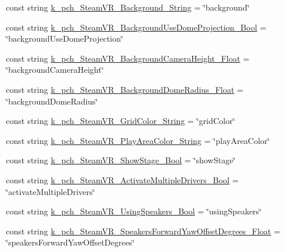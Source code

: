 \begin{DoxyCompactItemize}
\item 
const string \mbox{\hyperlink{class_valve_1_1_v_r_1_1_open_v_r_ac476335471ab953320c4975e76f6ca45}{k\+\_\+pch\+\_\+\+Steam\+V\+R\+\_\+\+Background\+\_\+\+String}} = \char`\"{}background\char`\"{}
\item 
const string \mbox{\hyperlink{class_valve_1_1_v_r_1_1_open_v_r_a50d2c14eea1e45dea273b474024fa258}{k\+\_\+pch\+\_\+\+Steam\+V\+R\+\_\+\+Background\+Use\+Dome\+Projection\+\_\+\+Bool}} = \char`\"{}background\+Use\+Dome\+Projection\char`\"{}
\item 
const string \mbox{\hyperlink{class_valve_1_1_v_r_1_1_open_v_r_a55c19346d64bab0aec92ed61ed8e7a4b}{k\+\_\+pch\+\_\+\+Steam\+V\+R\+\_\+\+Background\+Camera\+Height\+\_\+\+Float}} = \char`\"{}background\+Camera\+Height\char`\"{}
\item 
const string \mbox{\hyperlink{class_valve_1_1_v_r_1_1_open_v_r_a4d9da0c89b597c5deeda498ad23ae682}{k\+\_\+pch\+\_\+\+Steam\+V\+R\+\_\+\+Background\+Dome\+Radius\+\_\+\+Float}} = \char`\"{}background\+Dome\+Radius\char`\"{}
\item 
const string \mbox{\hyperlink{class_valve_1_1_v_r_1_1_open_v_r_ada1e10cbc0c2273168a100eb5f701267}{k\+\_\+pch\+\_\+\+Steam\+V\+R\+\_\+\+Grid\+Color\+\_\+\+String}} = \char`\"{}grid\+Color\char`\"{}
\item 
const string \mbox{\hyperlink{class_valve_1_1_v_r_1_1_open_v_r_a3fa54641b886ab22893e7f42b7356f61}{k\+\_\+pch\+\_\+\+Steam\+V\+R\+\_\+\+Play\+Area\+Color\+\_\+\+String}} = \char`\"{}play\+Area\+Color\char`\"{}
\item 
const string \mbox{\hyperlink{class_valve_1_1_v_r_1_1_open_v_r_a4f227228d77645224fd56de1d8c82416}{k\+\_\+pch\+\_\+\+Steam\+V\+R\+\_\+\+Show\+Stage\+\_\+\+Bool}} = \char`\"{}show\+Stage\char`\"{}
\item 
const string \mbox{\hyperlink{class_valve_1_1_v_r_1_1_open_v_r_ad9ea46d488e923c857ac87a0056598fc}{k\+\_\+pch\+\_\+\+Steam\+V\+R\+\_\+\+Activate\+Multiple\+Drivers\+\_\+\+Bool}} = \char`\"{}activate\+Multiple\+Drivers\char`\"{}
\item 
const string \mbox{\hyperlink{class_valve_1_1_v_r_1_1_open_v_r_a4ba6fd795d7cf6a985a4c12411d915d9}{k\+\_\+pch\+\_\+\+Steam\+V\+R\+\_\+\+Using\+Speakers\+\_\+\+Bool}} = \char`\"{}using\+Speakers\char`\"{}
\item 
const string \mbox{\hyperlink{class_valve_1_1_v_r_1_1_open_v_r_aa91111868860a8d766e7c22a1b8d3c1e}{k\+\_\+pch\+\_\+\+Steam\+V\+R\+\_\+\+Speakers\+Forward\+Yaw\+Offset\+Degrees\+\_\+\+Float}} = \char`\"{}speakers\+Forward\+Yaw\+Offset\+Degrees\char`\"{}

\end{DoxyCompactItemize}
